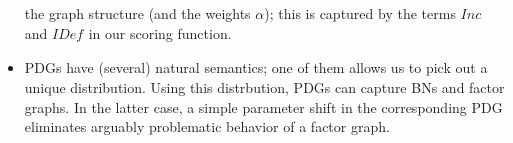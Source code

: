 \documentclass[letterpaper]{article} %
\theoremstyle{plain}
\theoremstyle{definition}
\theoremstyle{remark}
\newcommand{\IDef}[1]{\mathit{IDef}_{\!#1}}
\newcommand\Inc{\mathit{Inc}}
\begin{document}
\begin{itemize}
	the graph structure (and the weights $\alpha$); this is captured by the
	terms $\Inc$ and $\IDef{}$ in our scoring function.
\item PDGs have (several) natural semantics; one of them allows us to
pick out a unique distribution.  Using this distrbution, PDGs
	can capture BNs and factor graphs.
In the latter case, a simple parameter shift in the corresponding PDG eliminates
arguably problematic behavior of a factor graph.
\end{itemize}
\end{document}
